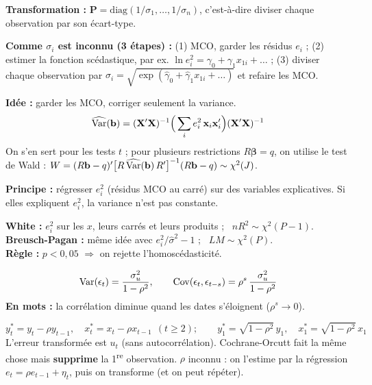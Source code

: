 \documentclass[12pt,a4paper]{article}
\newcommand{\vX}{\mathbf{X}}\newcommand{\vy}{\mathbf{y}}\newcommand{\vb}{\mathbf{b}}\newcommand{\ve}{\mathbf{e}}
\newcommand{\vbeta}{\bm{\beta}}\newcommand{\veps}{\bm{\epsilon}}\newcommand{\Om}{\bm{\Omega}}\newcommand{\Pm}{\mathbf{P}}
\begin{document}
\begin{outil}[title={Hétéroscédasticité : les MCGE}]
\textbf{Transformation :} $\Pm=\text{diag}(1/\sigma_1,\dots,1/\sigma_n)$, c'est-à-dire diviser chaque observation par son écart-type.

\textbf{Comme $\sigma_i$ est inconnu (3 étapes) :} (1) MCO, garder les résidus $e_i$ ; (2) estimer la fonction scédastique, par ex. $\ln e_i^2=\gamma_0+\gamma_1x_{1i}+\dots$ ; (3) diviser chaque observation par $\hat\sigma_i=\sqrt{\exp(\hat\gamma_0+\hat\gamma_1x_{1i}+\dots)}$ et refaire les MCO.
\end{outil}

\begin{outil}[title={Hétéroscédasticité : écarts-types robustes de White}]
\textbf{Idée :} garder les MCO, corriger seulement la variance.
\[
\widehat\Var(\vb)=(\vX'\vX)^{-1}\Big(\sum_i e_i^2\,\mathbf x_i\mathbf x_i'\Big)(\vX'\vX)^{-1}
\]
On s'en sert pour les tests $t$ ; pour plusieurs restrictions $R\vbeta=q$, on utilise le test de Wald :
$W=(R\vb-q)'\big[R\,\widehat\Var(\vb)\,R'\big]^{-1}(R\vb-q)\sim\chi^2(J)$.
\end{outil}

\begin{outil}[title={Tests d'hétéroscédasticité}]
\textbf{Principe :} régresser $e_i^2$ (résidus MCO au carré) sur des variables explicatives. Si elles expliquent $e_i^2$, la variance n'est pas constante.

\textbf{White :} $e_i^2$ sur les $x$, leurs carrés et leurs produits ; \ $nR^2\sim\chi^2(P-1)$.\\
\textbf{Breusch-Pagan :} même idée avec $e_i^2/\hat\sigma^2-1$ ; \ $LM\sim\chi^2(P)$.\\
\textbf{Règle :} $p<0{,}05$ $\Rightarrow$ on rejette l'homoscédasticité.
\end{outil}

\begin{outil}[title={Autocorrélation AR(1) : $\epsilon_t=\rho\epsilon_{t-1}+u_t$, \ $|\rho|<1$}]
\[
\operatorname{Var}(\epsilon_t)=\frac{\sigma_u^2}{1-\rho^2},\qquad \operatorname{Cov}(\epsilon_t,\epsilon_{t-s})=\rho^s\,\frac{\sigma_u^2}{1-\rho^2}
\]
\textbf{En mots :} la corrélation diminue quand les dates s'éloignent ($\rho^s\to0$).
\end{outil}

\begin{outil}[title={AR(1) : la transformation MCG (Prais-Winsten)}]
\[
y_t^*=y_t-\rho y_{t-1},\quad x_t^*=x_t-\rho x_{t-1}\ \ (t\ge2);\qquad y_1^*=\sqrt{1-\rho^2}\,y_1,\quad x_1^*=\sqrt{1-\rho^2}\,x_1
\]
L'erreur transformée est $u_t$ (sans autocorrélation). Cochrane-Orcutt fait la même chose mais \textbf{supprime} la 1\textsuperscript{re} observation. $\rho$ inconnu : on l'estime par la régression $e_t=\rho e_{t-1}+\eta_t$, puis on transforme (et on peut répéter).
\end{outil}
\end{document}
